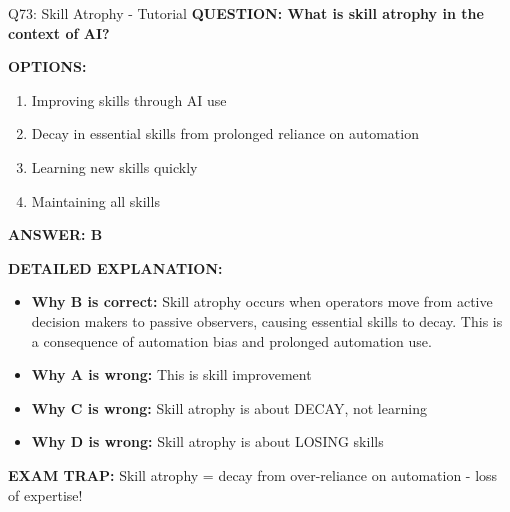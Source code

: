 \documentclass[8pt]{beamer}
\begin{document}
	\begin{frame}{Q73: Skill Atrophy - Tutorial}
		\fontsize{6.5}{7.5}\selectfont
		\textbf{QUESTION: What is skill atrophy in the context of AI?}
		
		\vspace{0.1cm}
		\textbf{OPTIONS:}
		\begin{enumerate}
			\item Improving skills through AI use
			\item Decay in essential skills from prolonged reliance on automation
			\item Learning new skills quickly
			\item Maintaining all skills
		\end{enumerate}
		
		\vspace{0.1cm}
		\textcolor{myblue}{\textbf{ANSWER: B}}
		
		\vspace{0.1cm}
		\textbf{DETAILED EXPLANATION:}
		\begin{itemize}
			\item \textbf{Why B is correct:} Skill atrophy occurs when operators move from active decision makers to passive observers, causing essential skills to decay. This is a consequence of automation bias and prolonged automation use.
			\item \textbf{Why A is wrong:} This is skill improvement
			\item \textbf{Why C is wrong:} Skill atrophy is about DECAY, not learning
			\item \textbf{Why D is wrong:} Skill atrophy is about LOSING skills
		\end{itemize}
		
		\textcolor{myred}{\textbf{EXAM TRAP:}} Skill atrophy = \textcolor{myblue}{decay from over-reliance on automation} - loss of expertise!
	\end{frame}
	
\end{document}
